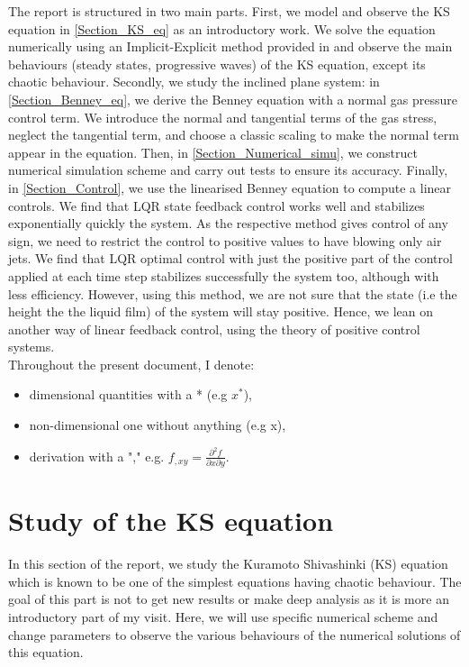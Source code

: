 \documentclass[12pt]{article}
\begin{document}
The report is structured in two main parts. First, we model and observe the KS equation in \eqref{Section_KS_eq} 
as an introductory work. We solve the equation numerically using an Implicit-Explicit method provided in 
\cite{Scheme_for_KS} and observe the main behaviours (steady states, progressive waves) of the KS equation, except its chaotic 
behaviour. Secondly, we study the inclined plane system: in \eqref{Section_Benney_eq}, we derive the Benney equation with a 
normal gas pressure control term. We introduce the normal and tangential terms of the gas stress, neglect the tangential 
term, and choose a classic scaling to make the normal term appear in the equation.  Then, in \eqref{Section_Numerical_simu}, 
we construct numerical simulation scheme and carry out tests to ensure its accuracy. Finally, in \eqref{Section_Control}, we 
use the linearised Benney equation to compute a linear controls. We find that LQR state feedback control works well and stabilizes
 exponentially quickly the system. As the respective method gives control of any sign, we need to restrict the control to positive values to 
 have blowing only air jets. We find that LQR optimal control with just the positive part of the control applied at each time step stabilizes 
 successfully the system too, although with less efficiency. However, using this method, we are not sure that the state (i.e the height the the 
 liquid film) of the system will stay positive. Hence, we lean on another way of linear feedback control, using the theory of positive control systems. 
\\

Throughout the present document, I denote: 
\begin{itemize}
    \item dimensional quantities with a * (e.g $x^*$), 
    \item non-dimensional one without anything (e.g x), 
    \item derivation with a "," e.g. $f_{,xy} = \frac{\partial^2 f}{\partial x\partial y}.$
\end{itemize}

\newpage
\section{Study of the KS equation}\label{Section_KS_eq}


In this section of the report, we study the Kuramoto Shivashinki (KS) equation which is known to be one of the simplest equations having chaotic behaviour.  The goal of this part is not to get new results or make deep analysis as it is more an introductory part of my visit. Here, we will use specific numerical scheme and change parameters to observe the various behaviours of the numerical solutions of this equation. 
\end{document}
